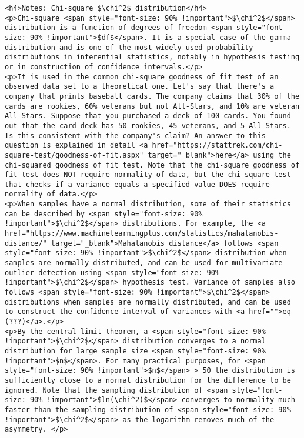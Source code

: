 \documentclass[11pt]{article}
\begin{document}
    \hypertarget{chi_square}{}

\begin{verbatim}
<h4>Notes: Chi-square $\chi^2$ distribution</h4>
<p>Chi-square <span style="font-size: 90% !important">$\chi^2$</span> distribution is a function of degrees of freedom <span style="font-size: 90% !important">$df$</span>. It is a special case of the gamma distribution and is one of the most widely used probability distributions in inferential statistics, notably in hypothesis testing or in construction of confidence intervals.</p>
<p>It is used in the common chi-square goodness of fit test of an observed data set to a theoretical one. Let's say that there's a company that prints baseball cards. The company claims that 30% of the cards are rookies, 60% veterans but not All-Stars, and 10% are veteran All-Stars. Suppose that you purchased a deck of 100 cards. You found out that the card deck has 50 rookies, 45 veterans, and 5 All-Stars. Is this consistent with the company's claim? An answer to this question is explained in detail <a href="https://stattrek.com/chi-square-test/goodness-of-fit.aspx" target="_blank">here</a> using the chi-squared goodness of fit test. Note that the chi-square goodness of fit test does NOT require normality of data, but the chi-square test that checks if a variance equals a specified value DOES require normality of data.</p>
<p>When samples have a normal distribution, some of their statistics can be described by <span style="font-size: 90% !important">$\chi^2$</span> distributions. For example, the <a href="https://www.machinelearningplus.com/statistics/mahalanobis-distance/" target="_blank">Mahalanobis distance</a> follows <span style="font-size: 90% !important">$\chi^2$</span> distribution when samples are normally distributed, and can be used for multivariate outlier detection using <span style="font-size: 90% !important">$\chi^2$</span> hypothesis test. Variance of samples also follows <span style="font-size: 90% !important">$\chi^2$</span> distributions when samples are normally distributed, and can be used to construct the confidence interval of variances with <a href="">eq (???)</a>.</p>
<p>By the central limit theorem, a <span style="font-size: 90% !important">$\chi^2$</span> distribution converges to a normal distribution for large sample size <span style="font-size: 90% !important">$n$</span>. For many practical purposes, for <span style="font-size: 90% !important">$n$</span> > 50 the distribution is sufficiently close to a normal distribution for the difference to be ignored. Note that the sampling distribution of <span style="font-size: 90% !important">$ln(\chi^2)$</span> converges to normality much faster than the sampling distribution of <span style="font-size: 90% !important">$\chi^2$</span> as the logarithm removes much of the asymmetry. </p>    

\end{verbatim}
\end{document}
